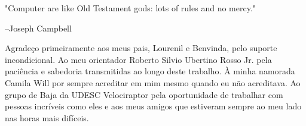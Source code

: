 
\bacharelado {}
\data {\today}





\newpage
\pagestyle{empty}

\maketitle
 \begin{epigrafe}
\noindent "Computer are like Old Testament gods: lots of rules and no mercy."

--Joseph Campbell
\end{epigrafe}

Agradeço primeiramente aos meus pais, Lourenil e Benvinda, pelo suporte incondicional. Ao meu orientador Roberto Silvio Ubertino Rosso Jr. pela paciência e sabedoria transmitidas ao longo deste trabalho. À minha namorada Camila Will por sempre acreditar em mim mesmo quando eu não acreditava. Ao grupo de Baja da UDESC Velociraptor pela oportunidade de trabalhar com pessoas incríveis como eles e aos meus amigos que estiveram sempre ao meu lado nas horas mais difíceis.   